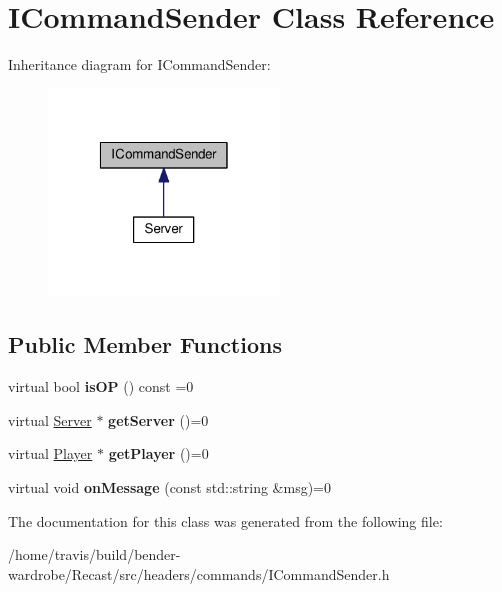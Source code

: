 \hypertarget{class_i_command_sender}{\section{I\-Command\-Sender Class Reference}
\label{class_i_command_sender}
}


Inheritance diagram for I\-Command\-Sender\-:
\nopagebreak
\begin{figure}[H]
\begin{center}
\leavevmode
\includegraphics[width=174pt]{class_i_command_sender__inherit__graph}
\end{center}
\end{figure}
\subsection*{Public Member Functions}
\begin{DoxyCompactItemize}
\item 
\hypertarget{class_i_command_sender_afe930466c485c8d9a67f624dc1dcac5e}{virtual bool {\bfseries is\-O\-P} () const =0}\label{class_i_command_sender_afe930466c485c8d9a67f624dc1dcac5e}

\item 
\hypertarget{class_i_command_sender_afe665fdd44daefad719049b540fc14b9}{virtual \hyperlink{class_server}{Server} $\ast$ {\bfseries get\-Server} ()=0}\label{class_i_command_sender_afe665fdd44daefad719049b540fc14b9}

\item 
\hypertarget{class_i_command_sender_abe8ec89d12e5de40cec1062da47f336c}{virtual \hyperlink{struct_player}{Player} $\ast$ {\bfseries get\-Player} ()=0}\label{class_i_command_sender_abe8ec89d12e5de40cec1062da47f336c}

\item 
\hypertarget{class_i_command_sender_a613b27b190c7fb5123597939c0896080}{virtual void {\bfseries on\-Message} (const std\-::string \&msg)=0}\label{class_i_command_sender_a613b27b190c7fb5123597939c0896080}

\end{DoxyCompactItemize}


The documentation for this class was generated from the following file\-:\begin{DoxyCompactItemize}
\item 
/home/travis/build/bender-\/wardrobe/\-Recast/src/headers/commands/I\-Command\-Sender.\-h\end{DoxyCompactItemize}
